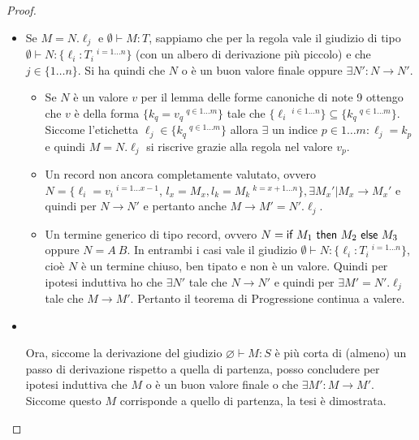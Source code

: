\begin{proof}
\begin{itemize}
\begin{itemize}
		\item {} Se $M = N.\ell_j$ e $\emptyset \vdash M : T$, sappiamo che per la regola  vale il giudizio di tipo $\emptyset \vdash N : \{ \ell_i : T_i \:^{i = 1 \ldots n}\}$ (con un albero di derivazione pi\`u piccolo) e che $j \in \{1 \ldots n\}$.
		Si ha quindi che $N$ o \`e un buon valore finale oppure $\exists N' : N \longrightarrow N'$.
		\begin{itemize}
			\item Se $N$ \`e un valore $v$ per il lemma delle forme canoniche di note 9 ottengo che
			$v$ \`e della forma $\{k_q = v_q \:^{q \in 1 \dots m} \}$ tale che $\{\ell_i\ ^{i \in 1 \dots n} \} \subseteq \{k_q\ ^{q \in 1 \dots m}\}$.
			Siccome l'etichetta $\ell_j \in \{k_q\ ^ {q \in 1 \dots m}\}$ allora $\exists$ un indice $p \in 1 \dots m : \ell_j = k_p$ e quindi $M = N.\ell_j$ si riscrive grazie alla regola  nel valore $v_p$.
			
			\item Un record non ancora completamente valutato, ovvero $N = \{ \ell_i = v_i \:^{i = 1 \ldots x-1}$, $ l_x = M_x, l_k = M_k \:^{k = x+1\ldots n}\}, \exists M_x'| M_x \to M_x'$ e quindi per  $N \to N'$ e pertanto anche $M \to M' = N'.\ell_j$.
			
			\item Un termine generico di tipo record, ovvero $N = \IF{M_1}{M_2}{M_3}$ oppure $N = A \: B$. In entrambi i casi vale il giudizio $\emptyset \vdash N : \{ \ell_i : T_i \:^{i = 1 \ldots n}\}$, cio\`e $N$ \`e un termine chiuso, ben tipato e non \`e un valore. 
			Quindi per ipotesi induttiva ho che $\exists N'$ tale che $N \to N'$ e quindi per  $\exists M' = N'.\ell_j$ tale che $M \to M'$.
			Pertanto il teorema di Progressione continua a valere.
			
		\end{itemize}
		
		
		
		
		\item {}\\
		
		
		Ora, siccome la derivazione del giudizio $\varnothing \vdash M  : S$ \`e pi\`u
		corta di (almeno) un passo di derivazione rispetto a quella di partenza,
		posso concludere per ipotesi induttiva che $M$ o \`e un buon valore finale o
		che $\exists M': M \longrightarrow M'$. Siccome questo $M$ corrisponde a
		quello di partenza, la tesi \`e dimostrata.

	\end{itemize}

\end{itemize}
\end{proof}

